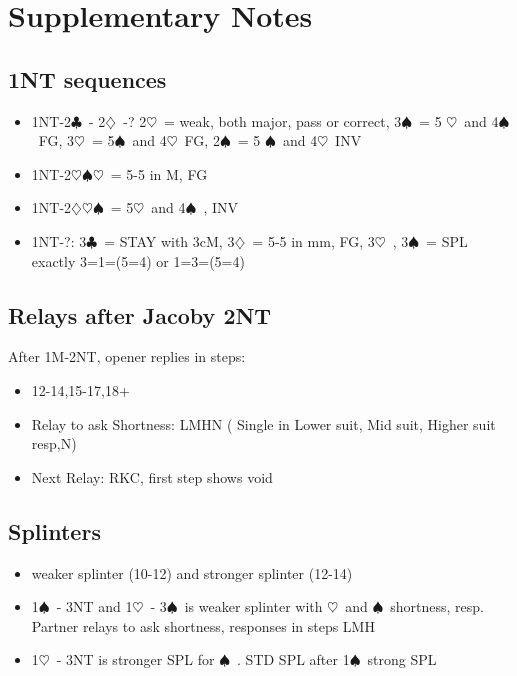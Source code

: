\documentclass{article}
\newcommand\C{\ensuremath{\clubsuit}}
\newcommand\D{\ensuremath{\diamondsuit}}
\renewcommand\H{\ensuremath{\heartsuit}}
\renewcommand\S{\ensuremath{\spadesuit}}
\begin{document}
\section{Supplementary Notes}
\begin{multicols}{2}
  \subsection{1NT sequences}
  \label{1ntfollowups}
  \begin{itemize}
    \item 1NT-2\C\ - 2\D\ -?  2\H\ = weak, both major, pass or correct, 3\S\ = 5 \H\ and 4\S\ FG, 3\H\ = 5\S\ and 4\H\ FG, 2\S\ = 5 \S\ and 4\H\ INV
    \item 1NT-2\H{}\S{}\H\ = 5-5 in M, FG
    \item 1NT-2\D{}\H{}\S\ = 5\H\ and 4\S\ , INV
    \item 1NT-?: 3\C\ = STAY with 3cM, 3\D\ = 5-5 in mm, FG, 3\H\ , 3\S\ = SPL exactly 3=1=(5=4) or 1=3=(5=4)
  \end{itemize}



  \subsection{Relays after Jacoby 2NT}
  \label{j2nt}
  After 1M-2NT, opener replies in steps:
  \begin{itemize}
    \item 12-14,15-17,18+
    \item Relay to ask Shortness: LMHN ( Single in Lower suit, Mid suit, Higher suit resp,N)
    \item Next Relay: RKC, first step shows void
  \end{itemize}
  \subsection{Splinters}
  \label{spl}
   \begin{itemize}
     \item weaker splinter (10-12) and stronger splinter (12-14)
     \item 1\S\ - 3NT and 1\H\ - 3\S\ is weaker splinter with \H\ and \S\ shortness, resp. Partner relays to ask shortness, responses in steps LMH 
     \item 1\H\ - 3NT is stronger SPL for \S\ . STD SPL after 1\S\ strong SPL  
   \end{itemize}

\end{multicols}
\end{document}
